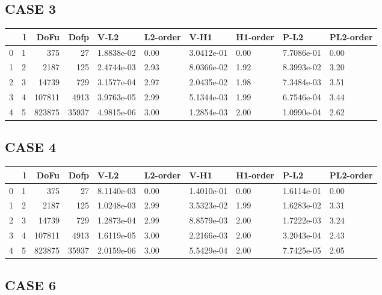 \documentclass[11pt]{article}
\numberwithin{equation}{section}    %
\begin{document}
\subsection*{CASE 3}

\begin{tabular}{lrrrllllll}
\hline
{} &  l &    DoFu &   Dofp &        V-L2 & L2-order &        V-H1 & H1-order &        P-L2 & PL2-order \\
\hline
0 &  1 &     375 &     27 &  1.8838e-02 &     0.00 &  3.0412e-01 &     0.00 &  7.7086e-01 &      0.00 \\
1 &  2 &    2187 &    125 &  2.4744e-03 &     2.93 &  8.0366e-02 &     1.92 &  8.3993e-02 &      3.20 \\
2 &  3 &   14739 &    729 &  3.1577e-04 &     2.97 &  2.0435e-02 &     1.98 &  7.3484e-03 &      3.51 \\
3 &  4 &  107811 &   4913 &  3.9763e-05 &     2.99 &  5.1344e-03 &     1.99 &  6.7546e-04 &      3.44 \\
4 &  5 &  823875 &  35937 &  4.9815e-06 &     3.00 &  1.2854e-03 &     2.00 &  1.0990e-04 &      2.62 \\
\hline
\end{tabular}


\subsection*{CASE 4}

\begin{tabular}{lrrrllllll}
\hline
{} &  l &    DoFu &   Dofp &        V-L2 & L2-order &        V-H1 & H1-order &        P-L2 & PL2-order \\
\hline
0 &  1 &     375 &     27 &  8.1140e-03 &     0.00 &  1.4010e-01 &     0.00 &  1.6114e-01 &      0.00 \\
1 &  2 &    2187 &    125 &  1.0248e-03 &     2.99 &  3.5323e-02 &     1.99 &  1.6283e-02 &      3.31 \\
2 &  3 &   14739 &    729 &  1.2873e-04 &     2.99 &  8.8579e-03 &     2.00 &  1.7222e-03 &      3.24 \\
3 &  4 &  107811 &   4913 &  1.6119e-05 &     3.00 &  2.2166e-03 &     2.00 &  3.2043e-04 &      2.43 \\
4 &  5 &  823875 &  35937 &  2.0159e-06 &     3.00 &  5.5429e-04 &     2.00 &  7.7425e-05 &      2.05 \\
\hline
\end{tabular}

\subsection*{CASE 6}
\end{document}
